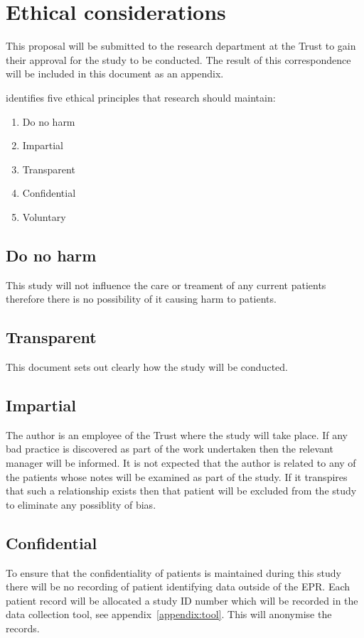 \documentclass
[
	12pt,
	a4paper,
	oneside,
]{article}
\begin{document}
\section{Ethical considerations}

This proposal will be submitted to the research department at the Trust to gain 
their approval for the study to be conducted. The result of this correspondence 
will be included in this document as an appendix.

\textcite{biggam:15} identifies five ethical principles that research should maintain:
\begin{enumerate}
\item Do no harm
\item Impartial
\item Transparent
\item Confidential
\item Voluntary
\end{enumerate}

\subsection{Do no harm}
This study will not influence the care or treament of any current patients therefore
there is no possibility of it causing harm to patients.

\subsection{Transparent}
This document sets out clearly how the study will be conducted.

\subsection{Impartial}
The author is an employee of the Trust where the study will take place. If any bad
practice is discovered as part of the work undertaken then the relevant manager
will be informed. It is not expected that the author is related to any of the patients
whose notes will be examined as part of the study. If it transpires that such a 
relationship exists then that patient will be excluded from the study to eliminate
any possiblity of bias.

\subsection{Confidential}
To ensure that the confidentiality of patients is maintained during this study there
will be no recording of patient identifying data outside of the EPR. Each patient
record will be allocated a study ID number which will be recorded in the data collection
tool, see appendix~\ref{appendix:tool}. This will anonymise the records.
\end{document}
